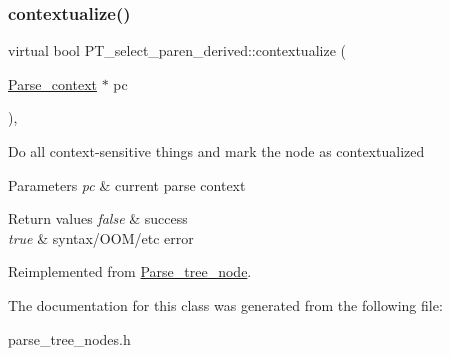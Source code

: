 \subsubsection{\texorpdfstring{contextualize()}{contextualize()}}
{\footnotesize\ttfamily virtual bool P\+T\+\_\+select\+\_\+paren\+\_\+derived\+::contextualize (\begin{DoxyParamCaption}\item[{\mbox{\hyperlink{structParse__context}{Parse\+\_\+context}} $\ast$}]{pc }\end{DoxyParamCaption})\hspace{0.3cm}{\ttfamily [inline]}, {\ttfamily [virtual]}}

Do all context-\/sensitive things and mark the node as contextualized


\begin{DoxyParams}{Parameters}
{\em pc} & current parse context\\
\hline
\end{DoxyParams}

\begin{DoxyRetVals}{Return values}
{\em false} & success \\
\hline
{\em true} & syntax/\+O\+O\+M/etc error \\
\hline
\end{DoxyRetVals}


Reimplemented from \mbox{\hyperlink{classParse__tree__node_a22d93524a537d0df652d7efa144f23da}{Parse\+\_\+tree\+\_\+node}}.



The documentation for this class was generated from the following file\+:\begin{DoxyCompactItemize}
\item 
parse\+\_\+tree\+\_\+nodes.\+h\end{DoxyCompactItemize}
